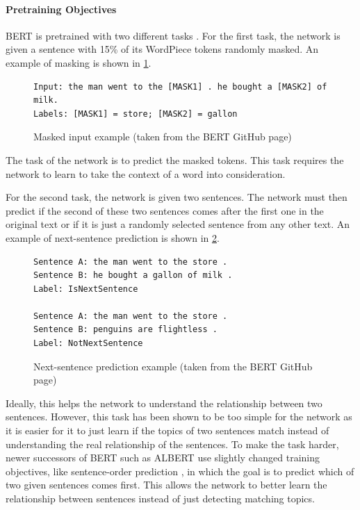 \paragraph{Pretraining Objectives}

BERT is pretrained with two different tasks \cite[p.~4--5]{devlin2018bert}.
For the first task, the network is given a sentence with 15\% of its WordPiece tokens randomly masked.
An example of masking is shown in \cref{fig:bert_masking_example}.

\begin{figure}[h]
\begin{lstlisting}[numbers=none]
Input: the man went to the [MASK1] . he bought a [MASK2] of milk.
Labels: [MASK1] = store; [MASK2] = gallon
\end{lstlisting}
\caption[Masked input example]{Masked input example (taken from the BERT GitHub page)}
\label{fig:bert_masking_example}
\end{figure}

The task of the network is to predict the masked tokens.
This task requires the network to learn to take the context of a word into consideration.

For the second task, the network is given two sentences.
The network must then predict if the second of these two sentences comes after the first one in the original text or if it is just a randomly selected sentence from any other text.
An example of next-sentence prediction is shown in \cref{fig:bert_next_sentence_example}.

\begin{figure}[h]
\begin{lstlisting}[numbers=none]
Sentence A: the man went to the store .
Sentence B: he bought a gallon of milk .
Label: IsNextSentence

Sentence A: the man went to the store .
Sentence B: penguins are flightless .
Label: NotNextSentence
\end{lstlisting}
\caption[Next-sentence prediction example]{Next-sentence prediction example (taken from the BERT GitHub page)}
\label{fig:bert_next_sentence_example}
\end{figure}

Ideally, this helps the network to understand the relationship between two sentences.
However, this task has been shown to be too simple for the network as it is easier for it to just learn if the topics of two sentences match instead of understanding the real relationship of the sentences.
To make the task harder, newer successors of BERT such as ALBERT use slightly changed training objectives, like sentence-order prediction \cite[p.~3]{1909.11942}, in which the goal is to predict which of two given sentences comes first.
This allows the network to better learn the relationship between sentences instead of just detecting matching topics.

